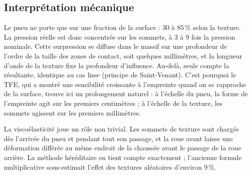 \subsection{Interprétation mécanique}
Le pneu ne porte que sur une fraction de la surface : 30 à 85\,\% selon la texture. La pression
réelle est donc concentrée sur les sommets, à 3 à 9 fois la pression nominale. Cette surpression
se diffuse dans le massif sur une profondeur de l'ordre de la taille des zones de contact, soit
quelques millimètres, et la longueur d'onde de la texture fixe la profondeur d'influence.
Au-delà, seule compte la résultante, identique au cas lisse (principe de Saint-Venant). C'est
pourquoi le TFE, qui a montré une sensibilité croissante à l'empreinte quand on se rapproche de
la surface, trouve ici un prolongement naturel : à l'échelle du pneu, la forme de l'empreinte
agit sur les premiers centimètres ; à l'échelle de la texture, les sommets agissent sur les
premiers millimètres.

La viscoélasticité joue un rôle non trivial. Les sommets de texture sont chargés dès l'arrivée
du pneu et pendant tout son passage, et la roue avant laisse une déformation différée au même
endroit de la chaussée avant le passage de la roue arrière. La méthode héréditaire en tient
compte exactement ; l'ancienne formule multiplicative sous-estimait l'effet des textures aléatoires d'environ 9\,\%.

